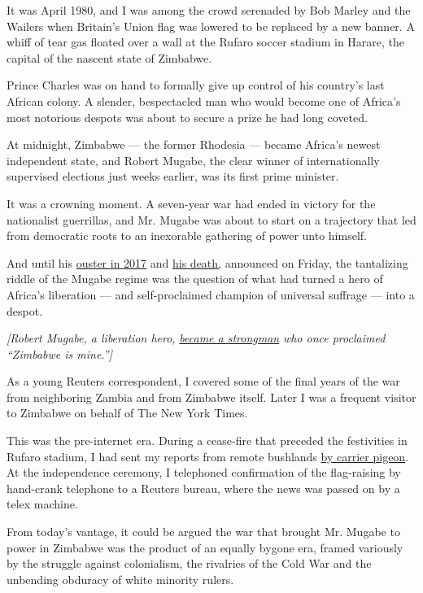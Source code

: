 It was April 1980, and I was among the crowd serenaded by Bob Marley and
the Wailers when Britain's Union flag was lowered to be replaced by a
new banner. A whiff of tear gas floated over a wall at the Rufaro soccer
stadium in Harare, the capital of the nascent state of Zimbabwe.

Prince Charles was on hand to formally give up control of his country's
last African colony. A slender, bespectacled man who would become one of
Africa's most notorious despots was about to secure a prize he had long
coveted.

At midnight, Zimbabwe --- the former Rhodesia --- became Africa's newest
independent state, and Robert Mugabe, the clear winner of
internationally supervised elections just weeks earlier, was its first
prime minister.

It was a crowning moment. A seven-year war had ended in victory for the
nationalist guerrillas, and Mr. Mugabe was about to start on a
trajectory that led from democratic roots to an inexorable gathering of
power unto himself.

And until his
\href{https://www.nytimes.com/2017/11/21/world/africa/zimbabwe-mugabe-mnangagwa.html}{ouster
in 2017} and
\href{https://www.nytimes.com/2019/09/06/obituaries/robert-mugabe-dead.html}{his
death,} announced on Friday, the tantalizing riddle of the Mugabe regime
was the question of what had turned a hero of Africa's liberation ---
and self-proclaimed champion of universal suffrage --- into a despot.

\emph{{[}Robert Mugabe, a liberation hero,}
\href{https://www.nytimes.com/2019/09/06/obituaries/robert-mugabe-dead.html}{\emph{became
a strongman}} \emph{who once proclaimed ``Zimbabwe is mine.''{]}}

As a young Reuters correspondent, I covered some of the final years of
the war from neighboring Zambia and from Zimbabwe itself. Later I was a
frequent visitor to Zimbabwe on behalf of The New York Times.

This was the pre-internet era. During a cease-fire that preceded the
festivities in Rufaro stadium, I had sent my reports from remote
bushlands
\href{https://www.nytimes.com/2019/09/06/reader-center/robert-mugabe-zimbabwe-independence.html}{by
carrier pigeon}. At the independence ceremony, I telephoned confirmation
of the flag-raising by hand-crank telephone to a Reuters bureau, where
the news was passed on by a telex machine.

From today's vantage, it could be argued the war that brought Mr. Mugabe
to power in Zimbabwe was the product of an equally bygone era, framed
variously by the struggle against colonialism, the rivalries of the Cold
War and the unbending obduracy of white minority rulers.

